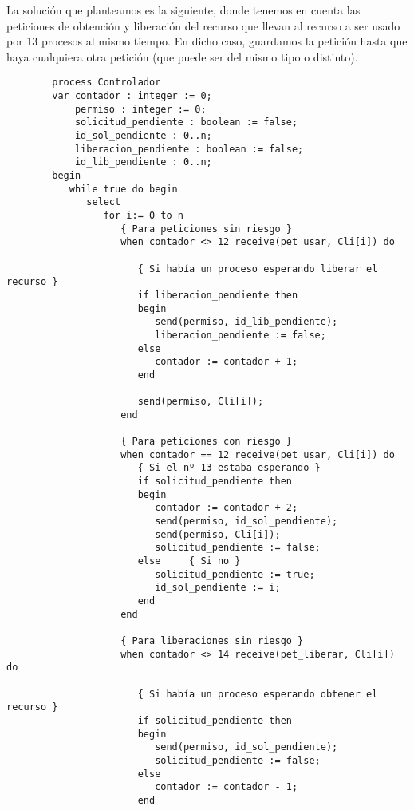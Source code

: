 \begin{ejercicio}
    La solución que planteamos es la siguiente, donde tenemos en cuenta las peticiones de obtención y liberación del recurso que llevan al recurso a ser usado por 13 procesos al mismo tiempo. En dicho caso, guardamos la petición hasta que haya cualquiera otra petición (que puede ser del mismo tipo o distinto).
    \begin{verbatim}
        process Controlador
        var contador : integer := 0;
            permiso : integer := 0;
            solicitud_pendiente : boolean := false;
            id_sol_pendiente : 0..n;
            liberacion_pendiente : boolean := false;
            id_lib_pendiente : 0..n;
        begin
           while true do begin
              select 
                 for i:= 0 to n
                    { Para peticiones sin riesgo }
                    when contador <> 12 receive(pet_usar, Cli[i]) do

                       { Si había un proceso esperando liberar el recurso }
                       if liberacion_pendiente then
                       begin
                          send(permiso, id_lib_pendiente);
                          liberacion_pendiente := false;
                       else
                          contador := contador + 1;
                       end

                       send(permiso, Cli[i]);
                    end

                    { Para peticiones con riesgo }
                    when contador == 12 receive(pet_usar, Cli[i]) do
                       { Si el nº 13 estaba esperando }
                       if solicitud_pendiente then 
                       begin
                          contador := contador + 2;
                          send(permiso, id_sol_pendiente);
                          send(permiso, Cli[i]);
                          solicitud_pendiente := false;
                       else     { Si no }
                          solicitud_pendiente := true;
                          id_sol_pendiente := i;
                       end
                    end

                    { Para liberaciones sin riesgo }
                    when contador <> 14 receive(pet_liberar, Cli[i]) do

                       { Si había un proceso esperando obtener el recurso }
                       if solicitud_pendiente then
                       begin
                          send(permiso, id_sol_pendiente);
                          solicitud_pendiente := false;
                       else
                          contador := contador - 1;
                       end


\end{verbatim}
\end{ejercicio}
